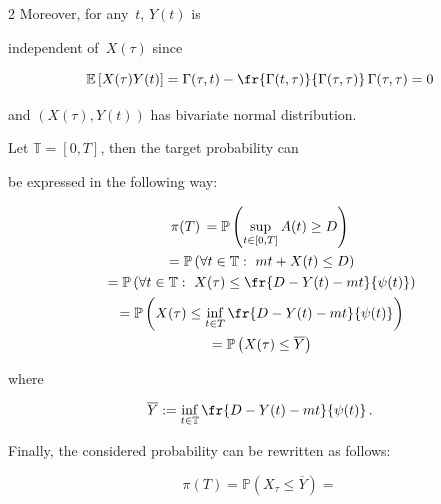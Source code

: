 \begin{multicols}{2}
Moreover, for any~$t$, $Y(t)$ is

independent of~$X(\tau)$ since

$$

\mathbb{E} \left[X(\tau)Y(t)\right]=

\Gamma(\tau,t)-

\fr{\Gamma(t,\tau)}{\Gamma(\tau,\tau)}\,\Gamma(\tau, \tau)=0

$$

and $(X(\tau),Y(t))$ has bivariate normal distribution.











Let $\mathbb{T} = [0,T]$, then the target probability can 

be expressed in the following way:

\begin{multline*}

\pi(T)\, =\mathbb{P}\left(\sup\limits_{t \in [0,T]}A(t)\ge D\right)\\

{}=\mathbb{P}\left(\forall t \in \mathbb{T}:\,\,mt+X(t) \le D\right)\\

{}=\mathbb{P}\left( \forall t \in \mathbb{T}:\,\, X(\tau) \le \fr{D-Y(t)-mt}{\psi(t)}\right)\\

{}=\mathbb{P}\left( X(\tau)\le \inf_{t \in T} \fr{D-Y(t)-mt}{\psi(t)}\right)\\

{}=\mathbb{P}\left( X(\tau)\le\overline{Y} \right)

\end{multline*}

where

\begin{equation*}

\overline{Y}:=\inf\limits_{t \in \mathbb{T}}\fr{D-Y(t)-mt}{\psi(t)}\,. 


\end{equation*}



Finally, the  considered probability can be rewritten as follows:



\begin{equation*}

\pi(T)=\mathbb{P}\left(X_{\tau}\le\overline{Y}\right)=


\end{equation*}
\end{multicols}
